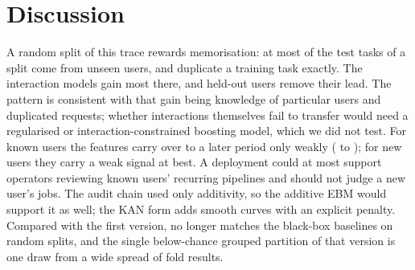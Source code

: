 \section{Discussion}
\label{sec:discussion}

A random split of this trace rewards memorisation: at most  of the  test tasks of a split come from unseen users, and  duplicate a training task exactly. The interaction models gain most there, and held-out users remove their lead. The pattern is consistent with that gain being knowledge of particular users and duplicated requests; whether interactions themselves fail to transfer would need a regularised or interaction-constrained boosting model, which we did not test. For known users the features carry over to a later period only weakly ( to ); for new users they carry a weak signal at best. A deployment could at most support operators reviewing known users' recurring pipelines and should not judge a new user's jobs. The audit chain used only additivity, so the additive EBM would support it as well; the KAN form adds smooth curves with an explicit penalty. Compared with the first version, \kaam{} no longer matches the black-box baselines on random splits, and the single below-chance grouped partition of that version is one draw from a wide spread of fold results.
